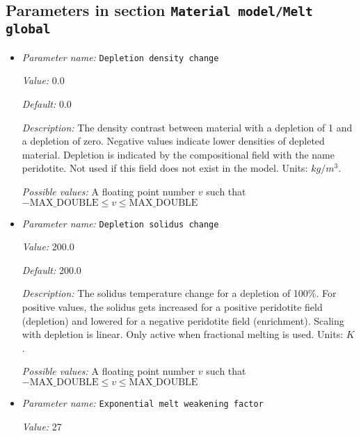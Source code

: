 \subsection{Parameters in section \tt Material model/Melt global}
\label{parameters:Material_20model/Melt_20global}

\begin{itemize}
\item {\it Parameter name:} {\tt Depletion density change}
\label{parameters:Material model/Melt global/Depletion density change}


{\it Value:} 0.0


{\it Default:} 0.0


{\it Description:} The density contrast between material with a depletion of 1 and a depletion of zero. Negative values indicate lower densities of depleted material. Depletion is indicated by the compositional field with the name peridotite. Not used if this field does not exist in the model. Units: $kg/m^3$.


{\it Possible values:} A floating point number $v$ such that $-\text{MAX\_DOUBLE} \leq v \leq \text{MAX\_DOUBLE}$
\item {\it Parameter name:} {\tt Depletion solidus change}
\label{parameters:Material model/Melt global/Depletion solidus change}


{\it Value:} 200.0


{\it Default:} 200.0


{\it Description:} The solidus temperature change for a depletion of 100\%. For positive values, the solidus gets increased for a positive peridotite field (depletion) and lowered for a negative peridotite field (enrichment). Scaling with depletion is linear. Only active when fractional melting is used. Units: $K$.


{\it Possible values:} A floating point number $v$ such that $-\text{MAX\_DOUBLE} \leq v \leq \text{MAX\_DOUBLE}$
\item {\it Parameter name:} {\tt Exponential melt weakening factor}
\label{parameters:Material model/Melt global/Exponential melt weakening factor}


{\it Value:} 27



\end{itemize}
